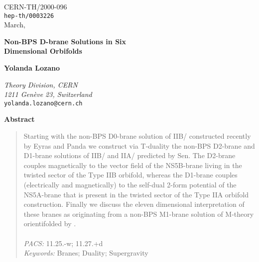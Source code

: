 \documentclass[12pt,a4paper]{article}
\begin{document}
\begin{flushright}
\footnotesize
\footnotesize
CERN-TH/2000-096\\
{\tt hep-th/0003226}\\
March, \coordHE{}
\normalsize
\end{flushright}

\begin{center}



\vspace{.8cm}
{\LARGE {\bf Non-BPS D-brane Solutions in Six}}\\
\vskip 7pt 
{\LARGE {\bf Dimensional Orbifolds}}

\vspace{1cm}


{\bf Yolanda Lozano}

\vspace{.1cm}

{
{\it Theory Division, CERN\\
1211 Gen\`eve 23, Switzerland}\\
{\tt yolanda.lozano@cern.ch}
}

\vspace{.4cm}



\vspace{2cm}


{\bf Abstract}

\end{center}
\begin{quotation}

\small

Starting with the non-BPS D0-brane solution of IIB/\coordHE{}
constructed recently by Eyras and Panda we construct via T-duality
the non-BPS D2-brane and D1-brane solutions of IIB/\coordHE{}
and IIA/\coordHE{} predicted by Sen. The D2-brane couples
magnetically to the vector field of the NS5B-brane living in the
twisted sector of the Type IIB orbifold, 
whereas the D1-brane couples (electrically
and magnetically) to the self-dual 2-form potential of the NS5A-brane
that is present in the twisted sector of the Type IIA orbifold construction.
Finally we discuss the eleven dimensional interpretation of these branes
as originating from a non-BPS M1-brane solution of M-theory
orientifolded  by \coordHE{}.\\
\\
{\it PACS:} 11.25.-w; 11.27.+d\\
{\it Keywords:} Branes; Duality; Supergravity


\end{quotation}
\end{document}
